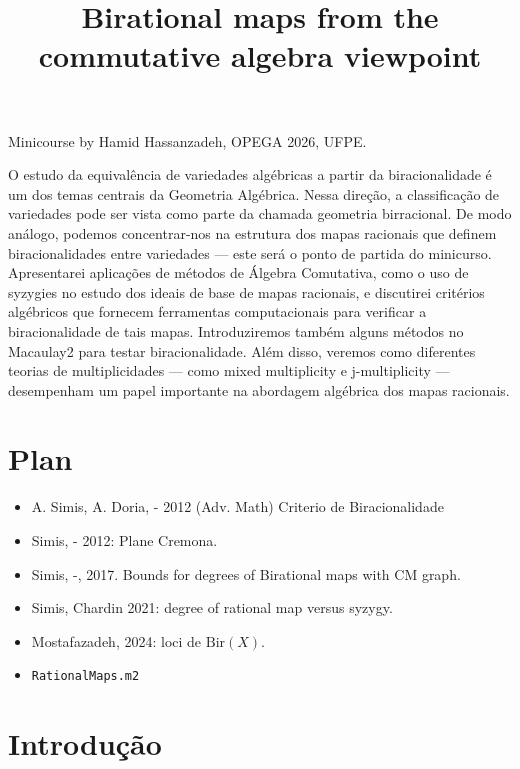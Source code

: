 



\title{Birational maps from the commutative
algebra viewpoint}
\maketitle

\noindent
Minicourse by Hamid Hassanzadeh,
OPEGA 2026, UFPE.

\medskip\noindent
O estudo da equivalência de variedades
algébricas a partir da biracionalidade é um
dos temas centrais da Geometria Algébrica.
Nessa direção, a classificação de variedades
pode ser vista como parte da chamada
geometria birracional. De modo análogo,
podemos concentrar-nos na estrutura dos mapas
racionais que definem biracionalidades entre
variedades — este será o ponto de partida do
minicurso. Apresentarei aplicações de métodos
de Álgebra Comutativa, como o uso de syzygies
no estudo dos ideais de base de mapas
racionais, e discutirei critérios algébricos
que fornecem ferramentas computacionais para
verificar a biracionalidade de tais mapas.
Introduziremos também alguns métodos no
Macaulay2 para testar biracionalidade. Além
disso, veremos como diferentes teorias de
multiplicidades — como mixed multiplicity e
j-multiplicity — desempenham um papel
importante na abordagem algébrica dos mapas
racionais.

\tableofcontents

\section{Plan}
\label{section-plan}

\begin{itemize}
\item A. Simis, A. Doria, - 2012 (Adv. Math)
Criterio de Biracionalidade
\item Simis, - 2012: Plane Cremona.
\item Simis, -, 2017. Bounds for degrees of
Birational maps with CM graph.
\item Simis, Chardin 2021:
degree of rational map versus syzygy.
\item Mostafazadeh, 2024: loci de
$\text{Bir}(X)$.
\item \texttt{RationalMaps.m2}
\end{itemize}

\section{Introdução}
\label{section-intro}


